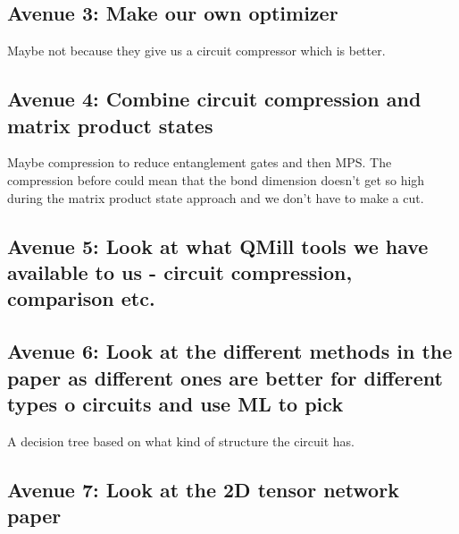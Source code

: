 \subsection{Avenue 3: Make our own optimizer}
Maybe not because they give us a circuit compressor which is better.


\subsection{Avenue 4: Combine circuit compression and matrix product states}

Maybe compression to reduce entanglement gates and then MPS. The compression before could mean that the bond dimension doesn't get so high during the matrix product state approach and we don't have to make a cut.


\subsection{Avenue 5: Look at what QMill tools we have available to us - circuit compression, comparison etc.}

\subsection{Avenue 6: Look at the different methods in the paper as different ones are better for different types o circuits and use ML to pick}

A decision tree based on what kind of structure the circuit has.

\subsection{Avenue 7: Look at the 2D tensor network paper}

